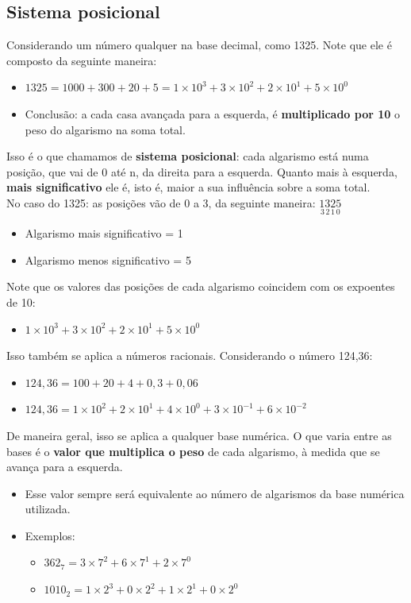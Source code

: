 \documentclass[12pt]{article}
\begin{document}
\subsection{Sistema posicional}
Considerando um número qualquer na base decimal, como 1325. Note que ele é composto da seguinte maneira:
\begin{itemize}
    \item [""] $1325 = 1000 + 300 + 20 + 5 = 1 \times 10^{3} + 3 \times 10^{2} + 2 \times 10^{1} + 5 \times 10^{0}$
    \item Conclusão: a cada casa avançada para a esquerda, é \textbf{multiplicado por 10} o peso do algarismo na soma total.
\end{itemize}
Isso é o que chamamos de \textbf{sistema posicional}: cada algarismo está numa posição, que vai de 0 até n, da direita para a esquerda. Quanto mais à esquerda, \textbf{mais significativo} ele é, isto é, maior a sua influência sobre a soma total.
\vspace{0.2cm} \\
No caso do 1325: as posições vão de 0 a 3, da seguinte maneira: $\underset{3\,2\,1\,0}{1325}$
\begin{itemize}
    \item Algarismo mais significativo = 1
    \item Algarismo menos significativo = 5
\end{itemize}
Note que os valores das posições de cada algarismo coincidem com os expoentes de 10:
\begin{itemize}
    \item $1 \times 10^{3} + 3 \times 10^{2} + 2 \times 10^{1} + 5 \times 10^{0}$
\end{itemize}
Isso também se aplica a números racionais. Considerando o número 124,36:
\begin{itemize}
    \item [""] $124,36 = 100 + 20 + 4 + 0,3 + 0,06$
    \item [""] $124{,}36 = 1 \times 10^{2} + 2 \times 10^{1} + 4 \times 10^{0} + 3 \times 10^{-1} + 6 \times 10^{-2}$
\end{itemize}
De maneira geral, isso se aplica a qualquer base numérica. O que varia entre as bases é o \textbf{valor que multiplica o peso} de cada algarismo, à medida que se avança para a esquerda.
\begin{itemize}
    \item Esse valor sempre será equivalente ao número de algarismos da base numérica utilizada.
    \item [""] Exemplos:
    \begin{itemize}
        \item $362_{7} = 3 \times 7^{2} + 6 \times 7^{1} + 2 \times 7^{0}$
        \item $1010_{2} = 1 \times 2^{3} + 0 \times 2^{2} + 1 \times 2^{1} + 0 \times 2^{0}$
    \end{itemize}
\end{itemize}
\end{document}
